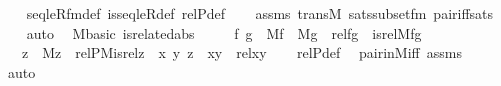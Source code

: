 \begin{isabellebody}
%
\isadelimproof
\ \ %
\endisadelimproof
%
\isatagproof
{}\isamarkupfalse%
\ seqleR{\isacharunderscore}{\kern0pt}fm{\isacharunderscore}{\kern0pt}def\ is{\isacharunderscore}{\kern0pt}seqleR{\isacharunderscore}{\kern0pt}def\ relP{\isacharunderscore}{\kern0pt}def\isanewline
\ \ \isamarkupfalse%
\ assms\ trans{\isacharunderscore}{\kern0pt}M\ sats{\isacharunderscore}{\kern0pt}subset{\isacharunderscore}{\kern0pt}fm\ pair{\isacharunderscore}{\kern0pt}iff{\isacharunderscore}{\kern0pt}sats\isanewline
\ \ \isamarkupfalse%
\ auto%
\endisatagproof
{\isafoldproof}%
%
\isadelimproof
\isanewline
%
\endisadelimproof
\isanewline
\isanewline
{}\isamarkupfalse%
\ {\isacharparenleft}{\kern0pt}\ M{\isacharunderscore}{\kern0pt}basic{\isacharparenright}{\kern0pt}\ is{\isacharunderscore}{\kern0pt}related{\isacharunderscore}{\kern0pt}abs\ {\isacharcolon}{\kern0pt}\isanewline
\ \ \ {\isachardoublequoteopen}{\isasymAnd}\ f\ g\ {\isachardot}{\kern0pt}\ M{\isacharparenleft}{\kern0pt}f{\isacharparenright}{\kern0pt}\ {\isasymLongrightarrow}\ M{\isacharparenleft}{\kern0pt}g{\isacharparenright}{\kern0pt}\ {\isasymLongrightarrow}\ rel{\isacharparenleft}{\kern0pt}f{\isacharcomma}{\kern0pt}g{\isacharparenright}{\kern0pt}\ {\isasymlongleftrightarrow}\ is{\isacharunderscore}{\kern0pt}rel{\isacharparenleft}{\kern0pt}M{\isacharcomma}{\kern0pt}f{\isacharcomma}{\kern0pt}g{\isacharparenright}{\kern0pt}{\isachardoublequoteclose}\isanewline
\ \ \ {\isachardoublequoteopen}{\isasymAnd}z\ {\isachardot}{\kern0pt}\ M{\isacharparenleft}{\kern0pt}z{\isacharparenright}{\kern0pt}\ {\isasymLongrightarrow}\ relP{\isacharparenleft}{\kern0pt}M{\isacharcomma}{\kern0pt}is{\isacharunderscore}{\kern0pt}rel{\isacharcomma}{\kern0pt}z{\isacharparenright}{\kern0pt}\ {\isasymlongleftrightarrow}\ {\isacharparenleft}{\kern0pt}{\isasymexists}x\ y{\isachardot}{\kern0pt}\ z\ {\isacharequal}{\kern0pt}\ {\isasymlangle}x{\isacharcomma}{\kern0pt}y{\isasymrangle}\ {\isasymand}\ rel{\isacharparenleft}{\kern0pt}x{\isacharcomma}{\kern0pt}y{\isacharparenright}{\kern0pt}{\isacharparenright}{\kern0pt}{\isachardoublequoteclose}\isanewline
%
\isadelimproof
\ \ %
\endisadelimproof
%
\isatagproof
{}\isamarkupfalse%
\ relP{\isacharunderscore}{\kern0pt}def\ \isamarkupfalse%
\ pair{\isacharunderscore}{\kern0pt}in{\isacharunderscore}{\kern0pt}M{\isacharunderscore}{\kern0pt}iff\ assms\ \isamarkupfalse%
\ auto%
\endisatagproof
{\isafoldproof}%
%
\isadelimproof
\isanewline
%

\end{isabellebody}
